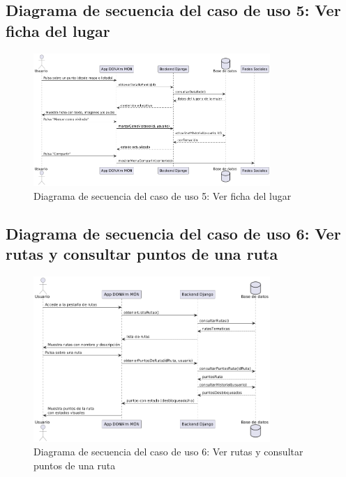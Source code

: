 \subsection{Diagrama de secuencia del caso de uso 5: Ver ficha del lugar}
\begin{figure}[H]
    \centering
    \includegraphics[width=0.8\textwidth]{figs/caso5.png}
    \caption{Diagrama de secuencia del caso de uso 5: Ver ficha del lugar}
\end{figure}

\subsection{Diagrama de secuencia del caso de uso 6: Ver rutas y consultar puntos de una ruta}
\begin{figure}[H]
    \centering
    \includegraphics[width=0.8\textwidth]{figs/caso6.png}
    \caption{Diagrama de secuencia del caso de uso 6: Ver rutas y consultar puntos de una ruta}
\end{figure}

